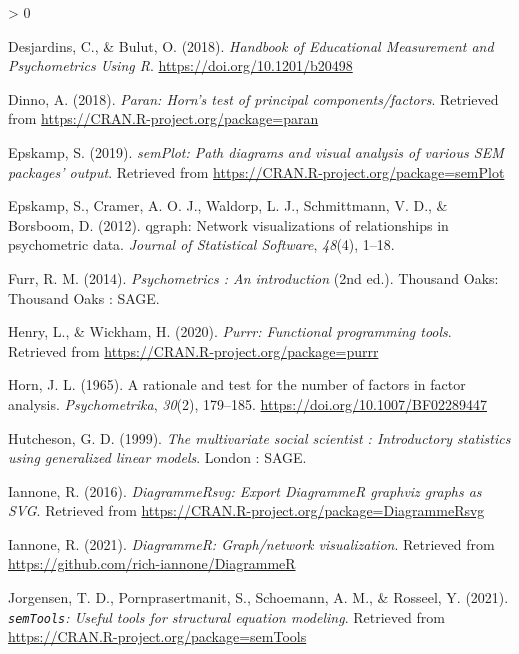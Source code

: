 \documentclass[
  english,
  man]{apa6}
\newlength{\cslhangindent}
\newenvironment{CSLReferences}[2] %
 {%
  \setlength{\parindent}{0pt}
  \ifodd #1 \everypar{\setlength{\hangindent}{\cslhangindent}}\ignorespaces\fi
  \ifnum #2 > 0
  \setlength{\parskip}{#2\baselineskip}
  \fi
 }%
 {}
\begin{document}
\begin{CSLReferences}{1}{0}
\leavevmode\hypertarget{ref-desjardinsHandbookEducationalMeasurement2018}{}%
Desjardins, C., \& Bulut, O. (2018). \emph{Handbook of {Educational Measurement} and {Psychometrics Using R}}. \url{https://doi.org/10.1201/b20498}

\leavevmode\hypertarget{ref-R-paran}{}%
Dinno, A. (2018). \emph{Paran: Horn's test of principal components/factors}. Retrieved from \url{https://CRAN.R-project.org/package=paran}

\leavevmode\hypertarget{ref-R-semPlot}{}%
Epskamp, S. (2019). \emph{semPlot: Path diagrams and visual analysis of various SEM packages' output}. Retrieved from \url{https://CRAN.R-project.org/package=semPlot}

\leavevmode\hypertarget{ref-R-qgraph}{}%
Epskamp, S., Cramer, A. O. J., Waldorp, L. J., Schmittmann, V. D., \& Borsboom, D. (2012). {qgraph}: Network visualizations of relationships in psychometric data. \emph{Journal of Statistical Software}, \emph{48}(4), 1--18.

\leavevmode\hypertarget{ref-furrPsychometricsIntroduction2014}{}%
Furr, R. M. (2014). \emph{Psychometrics : An introduction} (2nd ed.). {Thousand Oaks}: {Thousand Oaks : SAGE}.

\leavevmode\hypertarget{ref-R-purrr}{}%
Henry, L., \& Wickham, H. (2020). \emph{Purrr: Functional programming tools}. Retrieved from \url{https://CRAN.R-project.org/package=purrr}

\leavevmode\hypertarget{ref-hornRationaleTestNumber1965}{}%
Horn, J. L. (1965). A rationale and test for the number of factors in factor analysis. \emph{Psychometrika}, \emph{30}(2), 179--185. \url{https://doi.org/10.1007/BF02289447}

\leavevmode\hypertarget{ref-hutchesonMultivariateSocialScientist1999}{}%
Hutcheson, G. D. (1999). \emph{The multivariate social scientist : Introductory statistics using generalized linear models}. {London : SAGE}.

\leavevmode\hypertarget{ref-R-DiagrammeRsvg}{}%
Iannone, R. (2016). \emph{DiagrammeRsvg: Export DiagrammeR graphviz graphs as SVG}. Retrieved from \url{https://CRAN.R-project.org/package=DiagrammeRsvg}

\leavevmode\hypertarget{ref-R-DiagrammeR}{}%
Iannone, R. (2021). \emph{DiagrammeR: Graph/network visualization}. Retrieved from \url{https://github.com/rich-iannone/DiagrammeR}

\leavevmode\hypertarget{ref-R-semTools}{}%
Jorgensen, T. D., Pornprasertmanit, S., Schoemann, A. M., \& Rosseel, Y. (2021). \emph{\texttt{semTools}: {U}seful tools for structural equation modeling}. Retrieved from \url{https://CRAN.R-project.org/package=semTools}


\end{CSLReferences}
\end{document}
